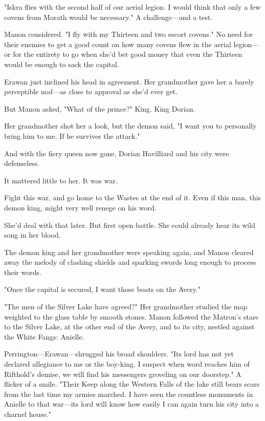 "Iskra flies with the second half of our aerial legion. I would think that only a few covens from Morath would be necessary." A challenge---and a test.

Manon considered. "I fly with my Thirteen and two escort covens." No need for their enemies to get a good count on how many covens flew in the aerial legion---or for the entirety to go when she'd bet good money that even the Thirteen would be enough to sack the capital.

Erawan just inclined his head in agreement. Her grandmother gave her a barely perceptible nod---as close to approval as she'd ever get.

But Manon asked, "What of the prince?" King. King Dorian.

Her grandmother shot her a look, but the demon said, "I want you to personally bring him to me. If he survives the attack."

And with the fiery queen now gone, Dorian Havilliard and his city were defenseless.

It mattered little to her. It was war.

Fight this war, and go home to the Wastes at the end of it. Even if this man, this demon king, might very well renege on his word.

She'd deal with that later. But first  open battle. She could already hear its wild song in her blood.

The demon king and her grandmother were speaking again, and Manon cleared away the melody of clashing shields and sparking swords long enough to process their words.

"Once the capital is secured, I want those boats on the Avery."

"The men of the Silver Lake have agreed?" Her grandmother studied the map weighted to the glass table by smooth stones. Manon followed the Matron's stare to the Silver Lake, at the other end of the Avery, and to its city, nestled against the White Fangs: Anielle.

Perrington---Erawan---shrugged his broad shoulders. "Its lord has not yet declared allegiance to me or the boy-king. I suspect when word reaches him of Rifthold's demise, we will find his messengers groveling on our doorstep." A flicker of a smile. "Their Keep along the Western Falls of the lake still bears scars from the last time my armies marched. I have seen the countless monuments in Anielle to that war---its lord will know how easily I can again turn his city into a charnel house."

